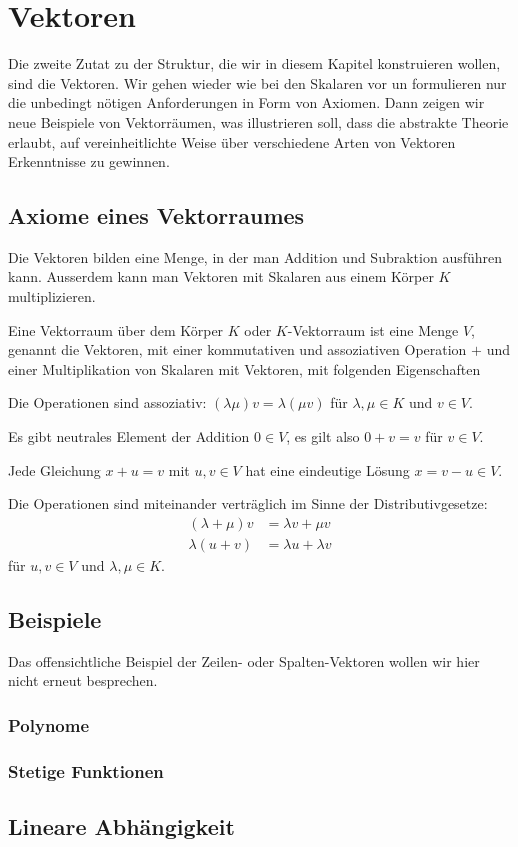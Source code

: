 %
%
%
\section{Vektoren}
Die zweite Zutat zu der Struktur, die wir in diesem Kapitel
konstruieren wollen, sind die Vektoren.
Wir gehen wieder wie bei den Skalaren vor un formulieren nur
die unbedingt nötigen Anforderungen in Form von Axiomen.
Dann zeigen wir neue Beispiele von Vektorräumen, was illustrieren soll,
dass die abstrakte Theorie erlaubt, auf vereinheitlichte Weise über
verschiedene Arten von Vektoren Erkenntnisse zu gewinnen.

\subsection{Axiome eines Vektorraumes}
Die Vektoren bilden eine Menge, in der man Addition und Subraktion 
ausführen kann.
Ausserdem kann man Vektoren mit Skalaren aus einem Körper $K$ multiplizieren.

\begin{definition}
Eine Vektorraum über dem Körper $K$ oder $K$-Vektorraum
ist eine Menge $V$, genannt die Vektoren,
mit einer kommutativen und assoziativen Operation $+$ und einer Multiplikation
von Skalaren mit Vektoren, mit folgenden Eigenschaften
\begin{compactenum}
\item Die Operationen sind assoziativ: $(\lambda\mu)v=\lambda(\mu v)$ für
$\lambda,\mu\in K$ und $v\in V$.
\item Es gibt neutrales Element der Addition $0\in V$, es gilt also
$0+v=v$ für $v\in V$.
\item Jede Gleichung $x+u=v$ mit $u,v\in V$ hat eine eindeutige Lösung
$x=v-u\in V$.
\item Die Operationen sind miteinander verträglich im Sinne der 
Distributivgesetze:
\begin{align*}
(\lambda + \mu)v&=\lambda v + \mu v
\\
\lambda(u+v)&=\lambda u + \lambda v
\end{align*}
für $u,v\in V$ und $\lambda,\mu\in K$.
\end{compactenum}
\end{definition}

\subsection{Beispiele}
Das offensichtliche Beispiel der Zeilen- oder Spalten-Vektoren wollen wir
hier nicht erneut besprechen.

\subsubsection{Polynome}

\subsubsection{Stetige Funktionen}

\subsection{Lineare Abhängigkeit}






